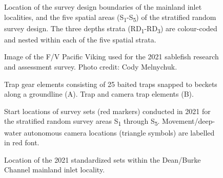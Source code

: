 \documentclass[12pt]{article}\usepackage[]{graphicx}\usepackage[]{color}
\begin{document}
\begin{figure}[htb]

{\centering {} 

}

\caption{Location of the survey design boundaries of the mainland inlet localities, and the five spatial areas (S\textsubscript{1}-S\textsubscript{5}) of the stratified random survey design. The three depths strata (RD\textsubscript{1}-RD\textsubscript{3}) are colour-coded and nested within each of the five spatial strata.}\label{fig:figure1}
\end{figure}
\clearpage


\begin{figure}[htb]

{\centering {} 

}

\caption{Image of the F/V Pacific Viking used for the 2021 sablefish research and assessment survey. Photo credit: Cody Melnychuk.}\label{fig:figure2}
\end{figure}
\clearpage


\begin{figure}[htb]

{\centering {} 

}

\caption{Trap gear elements consisting of 25 baited traps snapped to beckets along a groundline (A). Trap and camera trap elements (B).}\label{fig:figure3}
\end{figure}
\clearpage


\begin{figure}[htb]

{\centering {} 

}

\caption{Start locations of survey sets (red markers) conducted in 2021 for the stratified random survey areas S\textsubscript{1} through S\textsubscript{5}. Movement/deep-water autonomous camera locations (triangle symbols) are labelled in red font.}\label{fig:figure4}
\end{figure}
\clearpage


\begin{figure}[htb]

{\centering {} 

}

\caption{Location of the 2021 standardized sets within the Dean/Burke Channel mainland inlet locality.\\}\label{fig:figure5}
\end{figure}
\clearpage
\end{document}
